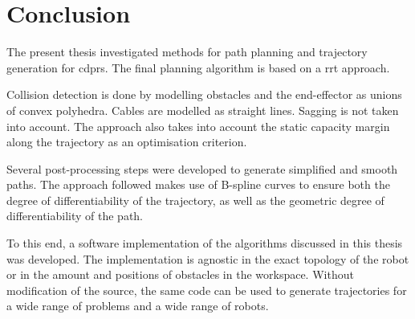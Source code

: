 \chapter{Conclusion}%
\label{chap:conclusion}

	The present thesis investigated methods for path planning and trajectory
	generation for \glspl{cdpr}. The final planning algorithm is based on a
	\gls{rrt} approach.

	Collision detection is done by modelling obstacles and the end-effector as
	unions of convex polyhedra. Cables are modelled as straight lines. Sagging
	is not taken into account. The approach also takes into account the static
	capacity margin along the trajectory as an optimisation criterion.

	Several post-processing steps were developed to generate simplified and
	smooth paths. The approach followed makes use of B-spline curves to ensure
	both the degree of differentiability of the trajectory, as well as the
	geometric degree of differentiability of the path.

	To this end, a software implementation of the algorithms discussed in this
	thesis was developed. The implementation is agnostic in the exact topology
	of the robot or in the amount and positions of obstacles in the workspace.
	Without modification of the source, the same code can be used to generate
	trajectories for a wide range of problems and a wide range of robots.

